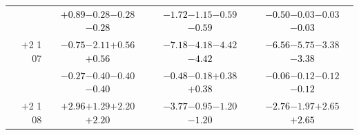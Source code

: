 \documentclass[compress]{beamer}
\begin{document}
\begin{frame}
\begin{tabular}{r | c | c | c}
          & \textcolor{black}{$+0.89$}\hspace{0.1 cm}$-0.28$\hspace{0.1 cm}$-0.28$\hspace{0.1 cm}\textcolor{black}{$-0.28$} & \textcolor{black}{$-1.72$}\hspace{0.1 cm}$-1.15$\hspace{0.1 cm}$-0.59$\hspace{0.1 cm}\textcolor{black}{$-0.59$} & \textcolor{black}{$-0.50$}\hspace{0.1 cm}$-0.03$\hspace{0.1 cm}$-0.03$\hspace{0.1 cm}\textcolor{black}{$-0.03$} \\
$+$2 1 07 & \textcolor{black}{$-0.75$}\hspace{0.1 cm}$-2.11$\hspace{0.1 cm}$+0.56$\hspace{0.1 cm}\textcolor{black}{$+0.56$} & \textcolor{black}{$-7.18$}\hspace{0.1 cm}$-4.18$\hspace{0.1 cm}$-4.42$\hspace{0.1 cm}\textcolor{black}{$-4.42$} & \textcolor{black}{$-6.56$}\hspace{0.1 cm}$-5.75$\hspace{0.1 cm}$-3.38$\hspace{0.1 cm}\textcolor{black}{$-3.38$} \\
          & \textcolor{black}{$-0.27$}\hspace{0.1 cm}$-0.40$\hspace{0.1 cm}$-0.40$\hspace{0.1 cm}\textcolor{black}{$-0.40$} & \textcolor{black}{$-0.48$}\hspace{0.1 cm}$-0.18$\hspace{0.1 cm}$+0.38$\hspace{0.1 cm}\textcolor{black}{$+0.38$} & \textcolor{black}{$-0.06$}\hspace{0.1 cm}$-0.12$\hspace{0.1 cm}$-0.12$\hspace{0.1 cm}\textcolor{black}{$-0.12$} \\
$+$2 1 08 & \textcolor{black}{$+2.96$}\hspace{0.1 cm}$+1.29$\hspace{0.1 cm}$+2.20$\hspace{0.1 cm}\textcolor{black}{$+2.20$} & \textcolor{black}{$-3.77$}\hspace{0.1 cm}$-0.95$\hspace{0.1 cm}$-1.20$\hspace{0.1 cm}\textcolor{black}{$-1.20$} & \textcolor{black}{$-2.76$}\hspace{0.1 cm}$-1.97$\hspace{0.1 cm}$+2.65$\hspace{0.1 cm}\textcolor{black}{$+2.65$} \\

\end{tabular}
\end{frame}
\end{document}
